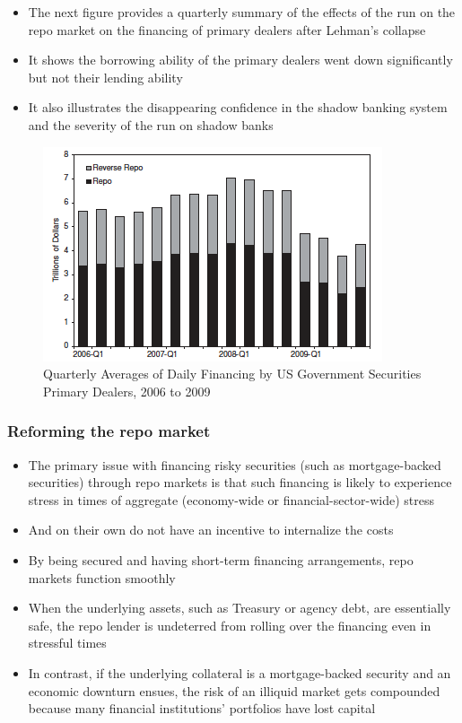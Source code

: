 \documentclass[11pt]{beamer}
\begin{document}
\begin{frame}
\begin{itemize}
\item The next figure provides a quarterly summary of the effects of the run on the repo market on the financing of primary dealers after Lehman’s collapse
\item It shows the borrowing ability of the primary dealers went down significantly but not their lending ability
\item It also illustrates the disappearing confidence in the shadow banking system and the severity of the run on shadow banks
\end{itemize}
\end{frame}

\begin{frame}
\begin{figure}
\includegraphics[width=\textwidth]{11_14.png}
\caption{Quarterly Averages of Daily Financing by US Government Securities Primary Dealers, 2006 to 2009}
\end{figure}
\end{frame}

\begin{frame}
\frametitle{Reforming the repo market}
\begin{itemize}
\item The primary issue with financing risky securities (such as mortgage-backed securities) through repo markets is that such financing is likely to experience stress in times of aggregate (economy-wide or financial-sector-wide) stress
\item And on their own do not have an incentive to internalize the costs
\item By being secured and having short-term financing arrangements, repo markets function smoothly
\item When the underlying assets, such as Treasury or agency debt, are essentially safe, the repo lender is undeterred from rolling over the financing even in stressful times
\item In contrast, if the underlying collateral is a mortgage-backed security and an economic downturn ensues, the risk of an illiquid market gets compounded because many financial institutions’ portfolios have lost capital
\end{itemize}
\end{frame}
\end{document}
